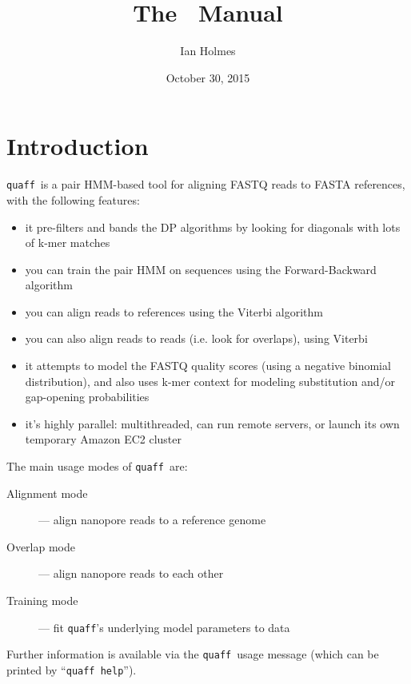 \documentclass{article}
\date{October 30, 2015}
\author{Ian Holmes}
\title{The \quaff\ Manual}
\newcommand\quaff{{\tt quaff}}
\begin{document}
\maketitle
\tableofcontents

\section{Introduction}

\quaff\ is a pair HMM-based tool for aligning FASTQ reads to FASTA references,
with the following features:

\begin{itemize}
\item it pre-filters and bands the DP algorithms by looking for diagonals
  with lots of k-mer matches

\item you can train the pair HMM on sequences using the Forward-Backward
  algorithm

\item you can align reads to references using the Viterbi algorithm

\item you can also align reads to reads (i.e. look for overlaps), using
  Viterbi

\item it attempts to model the FASTQ quality scores (using a negative
  binomial distribution), and also uses k-mer context for modeling
  substitution and/or gap-opening probabilities

\item it's highly parallel: multithreaded, can run remote servers,
  or launch its own temporary Amazon EC2 cluster

\end{itemize}

\newcommand\usagemodes{
The main usage modes of \quaff\ are:
\begin{description}
\item[Alignment mode] --- align nanopore reads to a reference genome
\item[Overlap mode] --- align nanopore reads to each other
\item[Training mode] --- fit \quaff's underlying model parameters to data
\end{description}
}

\usagemodes

Further information is available via the \quaff\ usage message
(which can be printed by ``{\tt quaff help}'').
\end{document}

